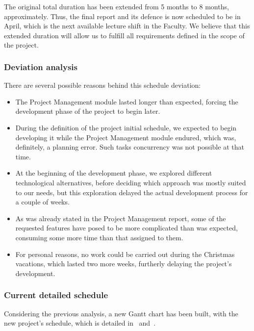 The original total duration has been extended from 5 months to 8 months, approximately. Thus, the final report and its defence is now scheduled to be in April, which is the next available lecture shift in the Faculty. We believe that this extended duration will allow us to fulfill all requirements defined in the scope of the project.

\subsubsection{Deviation analysis}

There are several possible reasons behind this schedule deviation:

\begin{itemize}
	\item The Project Management module lasted longer than expected, forcing the development phase of the project to begin later.
	\item During the definition of the project initial schedule, we expected to begin developing it while the Project Management module endured, which was, definitely, a planning error. Such tasks concurrency was not possible at that time.
	\item At the beginning of the development phase, we explored different technological alternatives, before deciding which approach was mostly suited to our needs, but this exploration delayed the actual development process for a couple of weeks.
	\item As was already stated in the Project Management report, some of the requested features have posed to be more complicated than was expected, consuming some more time than that assigned to them.
	\item For personal reasons, no work could be carried out during the Christmas vacations, which lasted two more weeks, furtherly delaying the project's development.
\end{itemize}

\subsubsection{Current detailed schedule}

Considering the previous analysis, a new Gantt chart has been built, with the new project's schedule, which is detailed in~ and~.

